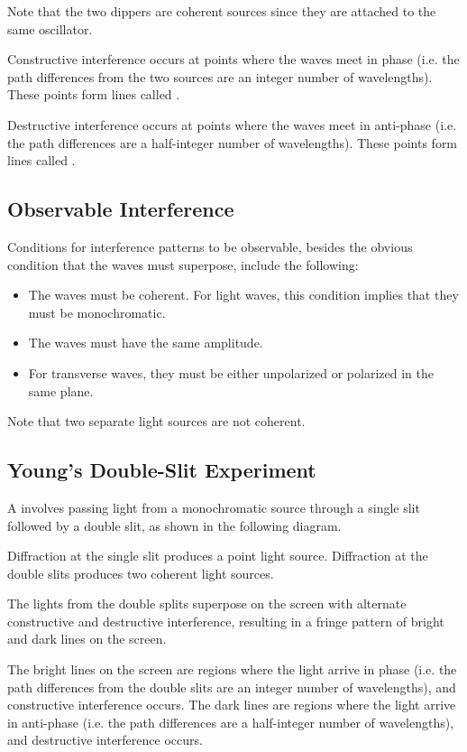 Note that the two dippers are coherent sources since they are attached to the same oscillator.

Constructive interference occurs at points where the waves meet in phase (i.e. the path differences from the two sources are an integer number of wavelengths). These points form lines called .

Destructive interference occurs at points where the waves meet in anti-phase (i.e. the path differences are a half-integer number of wavelengths). These points form lines called .

\subsection{Observable Interference}

Conditions for interference patterns to be observable, besides the obvious condition that the waves must superpose, include the following:
\begin{itemize}
    \item The waves must be coherent. For light waves, this condition implies that they must be monochromatic.
    \item The waves must have the same amplitude.
    \item For transverse waves, they must be either unpolarized or polarized in the same plane.
\end{itemize}

Note that two separate light sources are not coherent.

\subsection{Young's Double-Slit Experiment}

A  involves passing light from a monochromatic source through a single slit followed by a double slit, as shown in the following diagram.

Diffraction at the single slit produces a point light source. Diffraction at the double slits produces two coherent light sources.

The lights from the double splits superpose on the screen with alternate constructive and destructive interference, resulting in a fringe pattern of bright and dark lines on the screen.

The bright lines on the screen are regions where the light arrive in phase (i.e. the path differences from the double slits are an integer number of wavelengths), and constructive interference occurs. The dark lines are regions where the light arrive in anti-phase (i.e. the path differences are a half-integer number of wavelengths), and destructive interference occurs.

